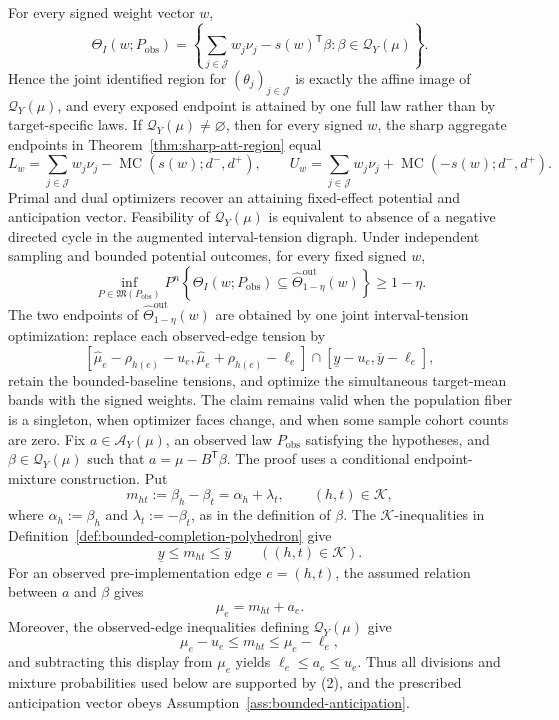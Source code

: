 For every signed weight vector \(w\),
\[
 \Theta_I(w;P_{\mathrm{obs}})
 =\left\{\sum_{j\in\mathcal J}w_j\nu_j-s(w)^{\mathsf T}\beta:
 \beta\in\mathcal Q_Y(\mu)\right\}.
\]
Hence the joint identified region for \((\theta_j)_{j\in\mathcal J}\) is exactly the affine image of \(\mathcal Q_Y(\mu)\), and every exposed endpoint is attained by one full law rather than by target-specific laws.
If \(\mathcal Q_Y(\mu)\ne\varnothing\), then for every signed \(w\), the sharp aggregate endpoints in Theorem~\ref{thm:sharp-att-region} equal
\[
 L_w=\sum_{j\in\mathcal J}w_j\nu_j-\operatorname{MC}(s(w);d^-,d^+),
 \qquad
 U_w=\sum_{j\in\mathcal J}w_j\nu_j+\operatorname{MC}(-s(w);d^-,d^+).
\]
Primal and dual optimizers recover an attaining fixed-effect potential and anticipation vector. Feasibility of \(\mathcal Q_Y(\mu)\) is equivalent to absence of a negative directed cycle in the augmented interval-tension digraph.
Under independent sampling and bounded potential outcomes, for every fixed signed \(w\),
\[
 \inf_{P\in\mathfrak M(P_{\mathrm{obs}})}P^n\left\{
 \Theta_I(w;P_{\mathrm{obs}})
 \subseteq\widehat\Theta^{\mathrm{out}}_{1-\eta}(w)
 \right\}\ge 1-\eta.
\]
The two endpoints of \(\widehat\Theta^{\mathrm{out}}_{1-\eta}(w)\) are obtained by one joint interval-tension optimization: replace each observed-edge tension by
\[
 [\widehat\mu_e-\rho_{h(e)}-u_e,\widehat\mu_e+\rho_{h(e)}-\ell_e]
 \cap[\underline y-u_e,\overline y-\ell_e],
\]
retain the bounded-baseline tensions, and optimize the simultaneous target-mean bands with the signed weights. The claim remains valid when the population fiber is a singleton, when optimizer faces change, and when some sample cohort counts are zero.
Fix \(a\in\mathcal A_Y(\mu)\), an observed law \(P_{\mathrm{obs}}\) satisfying the hypotheses, and \(\beta\in\mathcal Q_Y(\mu)\) such that \(a=\mu-B^{\mathsf T}\beta\).  The proof uses a conditional endpoint-mixture construction.  Put
\[
 m_{ht}:=\beta_h-\beta_t=\alpha_h+\lambda_t,
 \qquad (h,t)\in\mathcal K,
\tag{1}
\]
where \(\alpha_h:=\beta_h\) and \(\lambda_t:=-\beta_t\), as in the definition of \(\beta\).  The \(\mathcal K\)-inequalities in Definition~\ref{def:bounded-completion-polyhedron} give
\[
 \underline y\le m_{ht}\le\overline y
 \qquad((h,t)\in\mathcal K).
\tag{2}
\]
For an observed pre-implementation edge \(e=(h,t)\), the assumed relation between \(a\) and \(\beta\) gives
\[
 \mu_e=m_{ht}+a_e.
\tag{3}
\]
Moreover, the observed-edge inequalities defining \(\mathcal Q_Y(\mu)\) give
\[
 \mu_e-u_e\le m_{ht}\le\mu_e-\ell_e,
\]
and subtracting this display from \(\mu_e\) yields \(\ell_e\le a_e\le u_e\).  Thus all divisions and mixture probabilities used below are supported by (2), and the prescribed anticipation vector obeys Assumption~\ref{ass:bounded-anticipation}.


